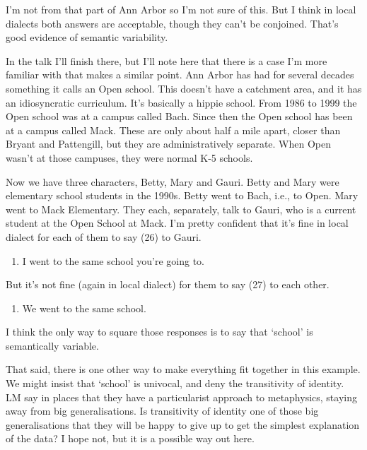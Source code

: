 \documentclass[
  11pt,
  letterpaper,
  DIV=11,
  numbers=noendperiod,
  twoside]{scrartcl}
\providecommand{\tightlist}{%
  \setlength{\itemsep}{0pt}\setlength{\parskip}{0pt}}
\begin{document}
I'm not from that part of Ann Arbor so I'm not sure of this. But I think
in local dialects both answers are acceptable, though they can't be
conjoined. That's good evidence of semantic variability.

In the talk I'll finish there, but I'll note here that there is a case
I'm more familiar with that makes a similar point. Ann Arbor has had for
several decades something it calls an Open school. This doesn't have a
catchment area, and it has an idiosyncratic curriculum. It's basically a
hippie school. From 1986 to 1999 the Open school was at a campus called
Bach. Since then the Open school has been at a campus called Mack. These
are only about half a mile apart, closer than Bryant and Pattengill, but
they are administratively separate. When Open wasn't at those campuses,
they were normal K-5 schools.

Now we have three characters, Betty, Mary and Gauri. Betty and Mary were
elementary school students in the 1990s. Betty went to Bach, i.e., to
Open. Mary went to Mack Elementary. They each, separately, talk to
Gauri, who is a current student at the Open School at Mack. I'm pretty
confident that it's fine in local dialect for each of them to say (26)
to Gauri.

\begin{enumerate}
\def\labelenumi{(\arabic{enumi})}
\setcounter{enumi}{25}
\tightlist
\item
  I went to the same school you're going to.
\end{enumerate}

But it's not fine (again in local dialect) for them to say (27) to each
other.

\begin{enumerate}
\def\labelenumi{(\arabic{enumi})}
\setcounter{enumi}{26}
\tightlist
\item
  We went to the same school.
\end{enumerate}

I think the only way to square those responses is to say that `school'
is semantically variable.

That said, there is one other way to make everything fit together in
this example. We might insist that `school' is univocal, and deny the
transitivity of identity. LM say in places that they have a
particularist approach to metaphysics, staying away from big
generalisations. Is transitivity of identity one of those big
generalisations that they will be happy to give up to get the simplest
explanation of the data? I hope not, but it is a possible way out here.
\end{document}
